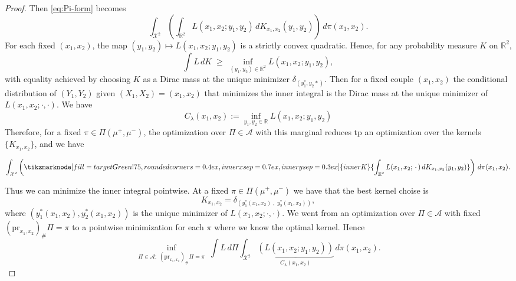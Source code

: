 \documentclass[11pt]{article}
\begin{document}
\begin{proof}
Then \eqref{eq:Pi-form} becomes
\[
\int_{\mathcal X^2}\left(\int_{\mathbb R^2} L(x_1,x_2;y_1,y_2)\,dK_{x_1,x_2}(y_1,y_2)\right)\,d\pi(x_1,x_2).
\]
For each fixed $(x_1,x_2)$, the map $(y_1,y_2)\mapsto L(x_1,x_2;y_1,y_2)$ is a strictly convex quadratic.
Hence, for any probability measure $K$ on $\mathbb R^2$,
\[
\int L\,dK \;\ge\; \inf_{(y_1,y_2)\in\mathbb R^2} L(x_1,x_2;y_1,y_2),
\]
with equality achieved by choosing $K$ as a Dirac mass at the unique minimizer $\delta_{(y_1^*, y_2*)}$.
Then for a fixed couple $(x_1, x_2)$ the conditional distribution of $(Y_1,Y_2)$ given $(X_1,X_2)=(x_1,x_2)$ that minimizes the inner integral is the Dirac mass at the unique minimizer of $L(x_1,x_2;\cdot,\cdot)$. 
We have
\begin{equation*}
  C_\lambda(x_1,x_2)
  :=
  \inf_{y_1,y_2\in\mathbb R}
  L(x_1,x_2;y_1,y_2)
\end{equation*}
Therefore, for a fixed $\pi\in\Pi(\mu^+,\mu^-)$, the optimization over $\Pi\in\mathcal A$ with this marginal reduces tp an optimization over the kernels $\{K_{x_1,x_2}\}$, and we have 

\begin{equation*}
  \int_{\mathcal X^2}
  \left(
  \tikzmarknode[fill=targetGreen!75,
               rounded corners=0.4ex,
               inner xsep=0.7ex,
               inner ysep=0.3ex]{innerK}
  {\displaystyle \int_{\mathbb R^2} L(x_1,x_2;\,\cdot\,)\,dK_{x_1,x_2}(y_1,y_2)}
  \right)
  \,d\pi(x_1,x_2).
  \end{equation*}
  

  Thus we can minimize the inner integral pointwise. At a fixed $\pi\in\Pi(\mu^+,\mu^-)$ we have that the best kernel choise is 
  \begin{equation*}
    K_{x_1,x_2} = \delta_{(y_1^*(x_1,x_2) \;, \;y_2^*(x_1,x_2))},
  \end{equation*}
  where $(y_1^*(x_1,x_2),y_2^*(x_1,x_2))$ is the unique minimizer of $L(x_1,x_2;\cdot,\cdot)$.
We went from an optimization over $\Pi\in\mathcal A$ with fixed $(\mathrm{pr}_{x_1,x_2})_\#\Pi=\pi$ to a pointwise minimization for each $\pi$ where we know the optimal kernel. 
Hence
\begin{equation*}
  \inf_{\Pi\in\mathcal A:\;(\mathrm{pr}_{x_1,x_2})_\#\Pi=\pi}\;
  \int L\,d\Pi
  \int_{\mathcal X^2}
  \underbrace{\left(
    L(x_1,x_2;y_1,y_2)
    \right)}_{C_\lambda(x_1,x_2)}
  \,d\pi(x_1,x_2).
\end{equation*}
  

\end{proof}
\end{document}
